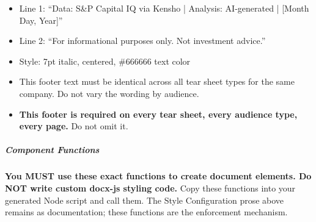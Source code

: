 \documentclass[11pt]{article}
\begin{document}
\begin{itemize}[leftmargin=*,itemsep=2pt,topsep=2pt]
\item {} Line 1: ``Data: S\&P Capital IQ via Kensho | Analysis: AI-generated | [Month Day, Year]''
\item {} Line 2: ``For informational purposes only. Not investment advice.''
\item {} Style: 7pt italic, centered, \#666666 text color
\item {} This footer text must be identical across all tear sheet types for the same company. Do not vary the wording by audience.
\item {} \textbf{This footer is required on every tear sheet, every audience type, every page.} Do not omit it.
\end{itemize}

\subparagraph{Component Functions}\mbox{}\par

\textbf{You MUST use these exact functions to create document elements. Do NOT write custom docx-js styling code.} Copy these functions into your generated Node script and call them. The Style Configuration prose above remains as documentation; these functions are the enforcement mechanism.
\end{document}
